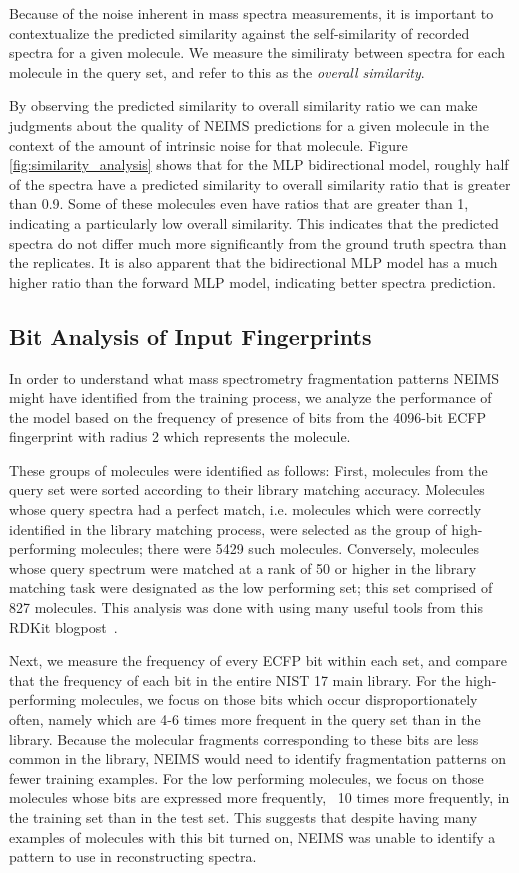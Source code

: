 Because of the noise inherent in mass spectra measurements, it is important to contextualize the predicted similarity against the self-similarity of recorded spectra for a given molecule. We measure the similiraty between spectra for each molecule in the query set, and refer to this as the \textit{overall similarity}.

By observing the predicted similarity to overall similarity ratio we can make judgments about the quality of NEIMS predictions for a given molecule in the context of the amount of intrinsic noise for that molecule.
Figure \ref{fig:similarity_analysis} shows that for the MLP bidirectional model, roughly half of the spectra have a predicted similarity to overall similarity ratio that is greater than 0.9. Some of these molecules even have ratios that are greater than 1, indicating a particularly low overall similarity. This indicates that the predicted spectra do not differ much more significantly from the ground truth spectra than the replicates.
It is also apparent that the bidirectional MLP model has a much higher ratio than the forward MLP model, indicating better spectra prediction. 

\subsection{Bit Analysis of Input Fingerprints}

In order to understand what mass spectrometry fragmentation patterns NEIMS might have identified from the training process, we analyze the performance of the model based on the frequency of presence of bits from the 4096-bit ECFP fingerprint with radius 2 which represents the molecule.

These groups of molecules were identified as follows: First, molecules from the query set were sorted according to their library matching accuracy. Molecules whose query spectra had a perfect match, i.e. molecules which were correctly identified in the library matching process, were selected as the group of high-performing molecules; there were 5429 such molecules. Conversely, molecules whose query spectrum were matched at a rank of 50 or higher in the library matching task were designated as the low performing set; this set comprised of 827 molecules. This analysis was done with using many useful tools from this RDKit blogpost~\cite{rdkit_blogpost_bit_statistics}.

Next, we measure the frequency of every ECFP bit within each set, and compare that the frequency of each bit in the entire NIST 17 main library. For the high-performing molecules, we focus on those bits which occur disproportionately often, namely which are 4-6 times more frequent in the query set than in the library. Because the molecular fragments corresponding to these bits are less common in the library, NEIMS would need to identify fragmentation patterns on fewer training examples. For the low performing molecules, we focus on those molecules whose bits are expressed more frequently, ~10 times more frequently, in the training set than in the test set. This suggests that despite having many examples of molecules with this bit turned on, NEIMS was unable to identify a pattern to use in reconstructing spectra.

